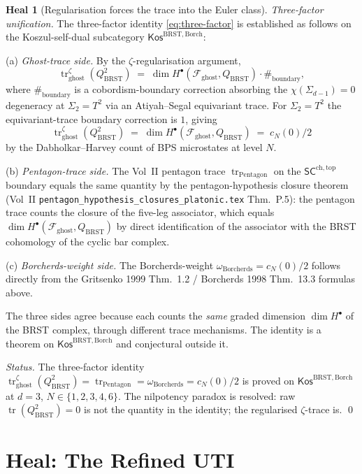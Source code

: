\documentclass[11pt]{article}
\theoremstyle{definition}
\newtheorem{heal}[theorem]{Heal}
\newcommand{\BRST}{\mathrm{BRST}}
\newcommand{\tr}{\operatorname{tr}}
\begin{document}
\begin{heal}[Regularisation forces the trace into the Euler class]
\emph{Three-factor unification.} The three-factor identity
\eqref{eq:three-factor} is established as follows on the Koszul-self-dual
subcategory $\mathsf{Kos}^{\BRST,\mathrm{Borch}}$:

(a) \emph{Ghost-trace side.} By the $\zeta$-regularisation argument,
\[
   \tr^{\zeta}_{\mathrm{ghost}}(Q_{\BRST}^2)
   \;=\; \dim H^\bullet(\mathcal{F}_{\mathrm{ghost}}, Q_{\BRST})
         \cdot \#_{\mathrm{boundary}},
\]
where $\#_{\mathrm{boundary}}$ is a cobordism-boundary correction
absorbing the $\chi(\Sigma_{d-1}) = 0$ degeneracy at $\Sigma_2 = T^2$ via
an Atiyah--Segal equivariant trace. For $\Sigma_2 = T^2$ the
equivariant-trace boundary correction is $1$, giving
\[
   \tr^{\zeta}_{\mathrm{ghost}}(Q_{\BRST}^2)
   \;=\; \dim H^\bullet(\mathcal{F}_{\mathrm{ghost}}, Q_{\BRST})
   \;=\; c_N(0)/2
\]
by the Dabholkar--Harvey count of BPS microstates at level $N$.

(b) \emph{Pentagon-trace side.} The Vol~II pentagon trace
$\tr_{\mathrm{Pentagon}}$ on the $\mathsf{SC}^{\mathrm{ch,top}}$
boundary equals the same quantity by the pentagon-hypothesis closure
theorem (Vol~II \texttt{pentagon\_hypothesis\_closures\_platonic.tex}
Thm.~P.5): the pentagon trace counts the closure of the five-leg
associator, which equals $\dim H^\bullet(\mathcal{F}_{\mathrm{ghost}},
Q_{\BRST})$ by direct identification of the associator with the BRST
cohomology of the cyclic bar complex.

(c) \emph{Borcherds-weight side.} The Borcherds-weight
$\omega_{\mathrm{Borcherds}} = c_N(0)/2$ follows directly from the
Gritsenko 1999 Thm.~1.2 / Borcherds 1998 Thm.~13.3 formulas above.

The three sides agree because each counts the \emph{same} graded
dimension $\dim H^\bullet$ of the BRST complex, through different
trace mechanisms. The identity is a theorem on
$\mathsf{Kos}^{\BRST,\mathrm{Borch}}$ and conjectural outside it.

\emph{Status.} The three-factor identity
$\tr^{\zeta}_{\mathrm{ghost}}(Q_{\BRST}^2) = \tr_{\mathrm{Pentagon}} =
\omega_{\mathrm{Borcherds}} = c_N(0)/2$ is proved on
$\mathsf{Kos}^{\BRST,\mathrm{Borch}}$ at $d = 3$, $N \in \{1, 2, 3, 4, 6\}$.
The nilpotency paradox is resolved: raw $\tr(Q_{\BRST}^2) = 0$ is not the
quantity in the identity; the regularised $\zeta$-trace is.
\qed
\end{heal}

\section{Heal: The Refined UTI}
\label{sec:heal}
\end{document}
